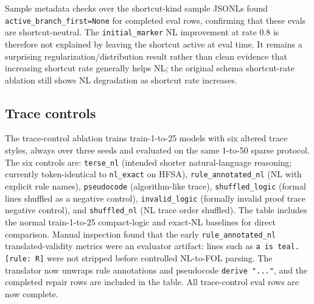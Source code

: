 \documentclass[10pt]{article}
\begin{document}
Sample metadata checks over the shortcut-kind sample JSONLs found \texttt{active\_branch\_first=None} for completed eval rows, confirming that these evals are shortcut-neutral. The \texttt{initial\_marker} NL improvement at rate 0.8 is therefore not explained by leaving the shortcut active at eval time. It remains a surprising regularization/distribution result rather than clean evidence that increasing shortcut rate generally helps NL; the original schema shortcut-rate ablation still shows NL degradation as shortcut rate increases.

\subsection{Trace controls}
The trace-control ablation trains train-1-to-25 models with six altered trace styles, always over three seeds and evaluated on the same 1-to-50 sparse protocol. The six controls are: \texttt{terse\_nl} (intended shorter natural-language reasoning; currently token-identical to \texttt{nl\_exact} on HFSA), \texttt{rule\_annotated\_nl} (NL with explicit rule names), \texttt{pseudocode} (algorithm-like trace), \texttt{shuffled\_logic} (formal lines shuffled as a negative control), \texttt{invalid\_logic} (formally invalid proof trace negative control), and \texttt{shuffled\_nl} (NL trace order shuffled). The table includes the normal train-1-to-25 compact-logic and exact-NL baselines for direct comparison. Manual inspection found that the early \texttt{rule\_annotated\_nl} translated-validity metrics were an evaluator artifact: lines such as \texttt{a is teal. [rule: R]} were not stripped before controlled NL-to-FOL parsing. The translator now unwraps rule annotations and pseudocode \texttt{derive "..."}, and the completed repair rows are included in the table. All trace-control eval rows are now complete.
\end{document}
